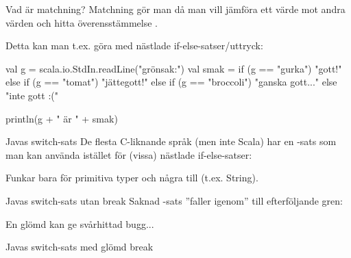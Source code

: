 \begin{Slide}{Vad är matchning?}
Matchning gör man då man vill jämföra ett värde mot andra värden och hitta överensstämmelse .

\pause

\vspace{1em}Detta kan man t.ex. göra med nästlade if-else-satser/uttryck:

\begin{Code}
val g = scala.io.StdIn.readLine("grönsak:")
val smak = 
  if (g == "gurka") "gott!"
  else if (g == "tomat") "jättegott!"
  else if (g == "broccoli") "ganska gott..."
  else "inte gott :("

println(g + " är " + smak)
\end{Code}
\end{Slide}




\begin{Slide}{Javas switch-sats}\SlideFontSmall
De flesta C-liknande språk (men inte Scala) har en -sats som man kan använda istället för (vissa) nästlade if-else-satser: 

\vspace{-0.5em}Funkar bara för primitiva typer och några till (t.ex. String).
\end{Slide}




\begin{Slide}{Javas switch-sats utan break}\SlideFontSmall
Saknad -sats ''faller igenom'' till efterföljande gren: 

En glömd  kan ge svårhittad bugg... 
\end{Slide}

\begin{Slide}{Javas switch-sats med glömd break}\SlideFontSmall

\vspace{-0.5em}

\vspace{-0.7em}\pause
{}

\end{Slide}



